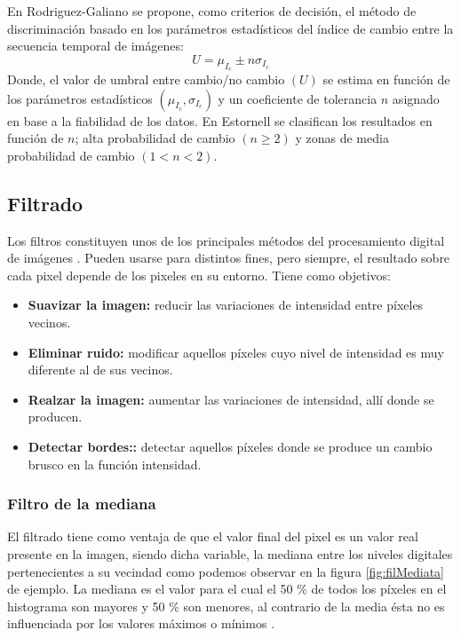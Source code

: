 
En Rodriguez-Galiano \cite{rodriguez2010analisis} se propone, como criterios de decisi\'on, el m\'etodo de discriminaci\'on basado en los par\'ametros estad\'isticos del \'indice de cambio entre la secuencia temporal de im\'agenes:
\begin{equation}
U=\mu_{I_{c}} \pm n\sigma _{I_{c}}
\end{equation}
Donde, el valor de umbral entre cambio/no cambio $ (U) $ se estima en funci\'on de los par\'ametros estad\'isticos $ (\mu_{I_{c}}, \sigma_{I_{c}}) $ y un coeficiente de tolerancia $ n $ asignado en base a la fiabilidad de los datos. En Estornell \cite{estornell2004analisis} se clasifican los resultados en funci\'on de $ n $; alta probabilidad de cambio $ (n \geq 2) $ y
zonas de media probabilidad de cambio $ (1 < n < 2) $.

\subsection{Filtrado}
Los filtros constituyen unos de los principales m\'etodos del procesamiento digital de im\'agenes . Pueden usarse para distintos fines, pero siempre, el resultado sobre cada pixel depende de los pixeles en su entorno. Tiene como objetivos: 
	\begin{itemize}
		\item \textbf{Suavizar la imagen:} reducir las variaciones de intensidad entre p\'ixeles vecinos.
		\item \textbf{Eliminar ruido:}  modificar aquellos p\'ixeles cuyo nivel de intensidad es muy diferente al de sus vecinos.
		\item \textbf{Realzar la imagen:} aumentar las variaciones de intensidad, all\'i donde se producen.
		\item \textbf{Detectar bordes::} detectar aquellos p\'ixeles donde se produce un cambio brusco en la funci\'on intensidad.	
	\end{itemize}
\subsubsection{Filtro de la mediana}\label{subsec:filMediana}
El filtrado tiene como ventaja de que el valor final del pixel es un valor real presente en la imagen, siendo dicha variable, la mediana entre los niveles digitales pertenecientes a su vecindad como podemos observar en la figura \ref{fig:filMediata} de ejemplo. La mediana es el valor para el cual el 50 \% de todos los p\'ixeles en el histograma son mayores y 50 \% son menores, al contrario de la media \'esta no es influenciada por los valores m\'aximos o m\'inimos \cite{mehl1997fundamentos}.

